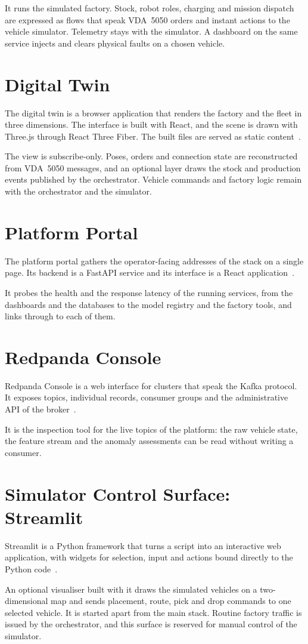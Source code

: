 It runs the simulated factory. Stock, robot roles, charging and mission dispatch are expressed as flows that speak VDA~5050 orders and instant actions to the vehicle simulator. Telemetry stays with the simulator. A dashboard on the same service injects and clears physical faults on a chosen vehicle.

\section{Digital Twin}
The digital twin is a browser application that renders the factory and the fleet in three dimensions. The interface is built with React, and the scene is drawn with Three.js through React Three Fiber. The built files are served as static content~\cite{react,threejs}.

The view is subscribe-only. Poses, orders and connection state are reconstructed from VDA~5050 messages, and an optional layer draws the stock and production events published by the orchestrator. Vehicle commands and factory logic remain with the orchestrator and the simulator.

\section{Platform Portal}
The platform portal gathers the operator-facing addresses of the stack on a single page. Its backend is a FastAPI service and its interface is a React application~\cite{fastapi,react}.

It probes the health and the response latency of the running services, from the dashboards and the databases to the model registry and the factory tools, and links through to each of them.

\section{Redpanda Console}
Redpanda Console is a web interface for clusters that speak the Kafka protocol. It exposes topics, individual records, consumer groups and the administrative API of the broker~\cite{redpanda_console}.

It is the inspection tool for the live topics of the platform: the raw vehicle state, the feature stream and the anomaly assessments can be read without writing a consumer.

\section{Simulator Control Surface: Streamlit}
Streamlit is a Python framework that turns a script into an interactive web application, with widgets for selection, input and actions bound directly to the Python code~\cite{streamlit}.

An optional visualiser built with it draws the simulated vehicles on a two-dimensional map and sends placement, route, pick and drop commands to one selected vehicle. It is started apart from the main stack. Routine factory traffic is issued by the orchestrator, and this surface is reserved for manual control of the simulator.